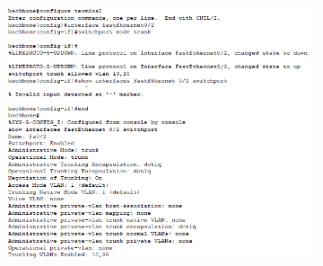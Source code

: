 \begin{figure}[!htb]\ContinuedFloat
    \centering
    \begin{subfigure}{\textwidth}
        \includegraphics[width=\textwidth,height=.8\textheight]{./img/Backbone/Access2.png}
    \end{subfigure}
\end{figure}
\FloatBarrier
